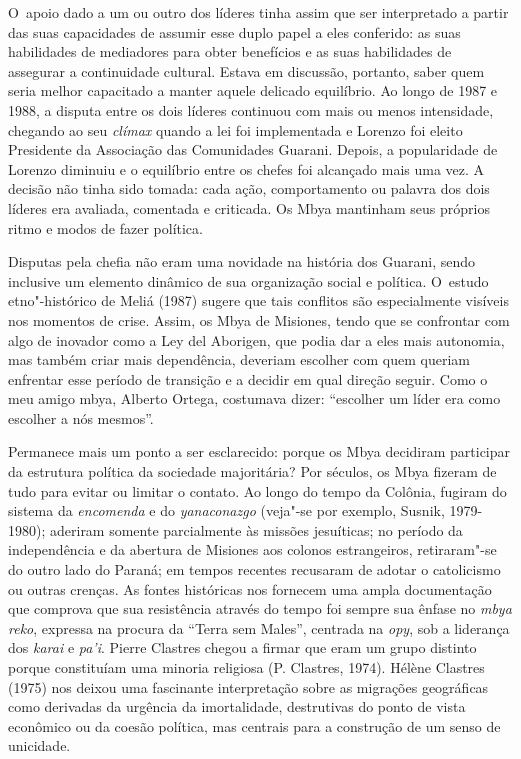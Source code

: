 O~apoio dado a um ou outro dos líderes tinha assim que ser interpretado
a partir das suas capacidades de assumir esse duplo papel a eles
conferido: as suas habilidades de mediadores para obter benefícios e as
suas habilidades de assegurar a continuidade cultural. Estava em
discussão, portanto, saber quem seria melhor capacitado a manter aquele
delicado equilíbrio. Ao longo de 1987 e 1988, a disputa entre os dois
líderes continuou com mais ou menos intensidade, chegando ao seu \emph{clímax}
quando a lei foi implementada e Lorenzo foi eleito Presidente da
Associação das Comunidades Guarani. Depois, a popularidade de Lorenzo
diminuiu e o equilíbrio entre os chefes foi alcançado mais uma vez. A
decisão não tinha sido tomada: cada ação, comportamento ou palavra dos
dois líderes era avaliada, comentada e criticada. Os Mbya mantinham
seus próprios ritmo e modos de fazer política. 

Disputas pela chefia não eram uma novidade na história dos Guarani,
sendo inclusive um elemento dinâmico de sua organização social e
política. O~estudo etno"-histórico de Meliá (1987) sugere que tais
conflitos são especialmente visíveis nos momentos de crise. Assim, os
Mbya de Misiones, tendo que se confrontar com algo de inovador como a
Ley del Aborigen, que podia dar a eles mais autonomia, mas também criar
mais dependência, deveriam escolher com quem queriam enfrentar esse
período de transição e a decidir em qual direção seguir. Como o meu
amigo mbya, Alberto Ortega, costumava dizer: ``escolher um líder era
como escolher a nós mesmos''.

Permanece mais um ponto a ser esclarecido: porque os Mbya decidiram
participar da estrutura política da sociedade majoritária? Por séculos,
os Mbya fizeram de tudo para evitar ou limitar o contato. Ao longo do
tempo da Colônia, fugiram do sistema da \emph{encomenda} e do \emph{yanaconazgo}
(veja"-se por exemplo, Susnik, 1979-1980); aderiram somente parcialmente
às missões jesuíticas; no período da independência e da abertura de
Misiones aos colonos estrangeiros, retiraram"-se do outro lado do
Paraná; em tempos recentes recusaram de adotar o catolicismo ou outras
crenças. As fontes históricas nos fornecem uma ampla documentação que
comprova que sua resistência através do tempo foi sempre sua ênfase no
\emph{mbya reko}, expressa na procura da ``Terra sem Males'', centrada na \emph{opy},
sob a liderança dos \emph{karai} e \emph{pa’i}. Pierre Clastres chegou a firmar que
eram um grupo distinto porque constituíam uma minoria religiosa (P.
Clastres, 1974). Hélène Clastres (1975) nos deixou uma fascinante
interpretação sobre as migrações geográficas como derivadas da urgência
da imortalidade, destrutivas do ponto de vista econômico ou da coesão
política, mas centrais para a construção de um senso de unicidade. 

